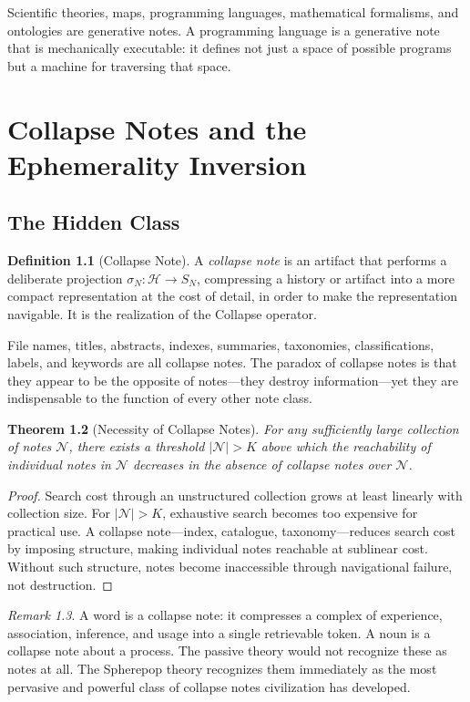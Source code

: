 \documentclass[12pt, a4paper, openany]{book}
\theoremstyle{plain}
\newtheorem{theorem}{Theorem}[chapter]
\theoremstyle{definition}
\newtheorem{definition}[theorem]{Definition}
\theoremstyle{remark}
\newtheorem{remark}[theorem]{Remark}
\newcommand{\calH}{\mathcal{H}}
\newcommand{\calN}{\mathcal{N}}
\begin{document}
Scientific theories, maps, programming languages, mathematical formalisms, and
ontologies are generative notes. A programming language is a generative note that
is mechanically executable: it defines not just a space of possible programs but
a machine for traversing that space.

\chapter{Collapse Notes and the Ephemerality Inversion}

\section{The Hidden Class}

\begin{definition}[Collapse Note]
A \emph{collapse note} is an artifact that performs a deliberate projection
$\sigma_N : \calH \to S_N$, compressing a history or artifact into a more compact
representation at the cost of detail, in order to make the representation
navigable. It is the realization of the Collapse operator.
\end{definition}

File names, titles, abstracts, indexes, summaries, taxonomies, classifications,
labels, and keywords are all collapse notes. The paradox of collapse notes is that
they appear to be the opposite of notes---they destroy information---yet they are
indispensable to the function of every other note class.

\begin{theorem}[Necessity of Collapse Notes]
For any sufficiently large collection of notes $\calN$, there exists a threshold
$|\calN| > K$ above which the reachability of individual notes in $\calN$ decreases
in the absence of collapse notes over $\calN$.
\end{theorem}

\begin{proof}
Search cost through an unstructured collection grows at least linearly with
collection size. For $|\calN| > K$, exhaustive search becomes too expensive for
practical use. A collapse note---index, catalogue, taxonomy---reduces search cost
by imposing structure, making individual notes reachable at sublinear cost.
Without such structure, notes become inaccessible through navigational failure,
not destruction.
\end{proof}

\begin{remark}
A word is a collapse note: it compresses a complex of experience, association,
inference, and usage into a single retrievable token. A noun is a collapse note
about a process. The passive theory would not recognize these as notes at all.
The Spherepop theory recognizes them immediately as the most pervasive and powerful
class of collapse notes civilization has developed.
\end{remark}
\end{document}
